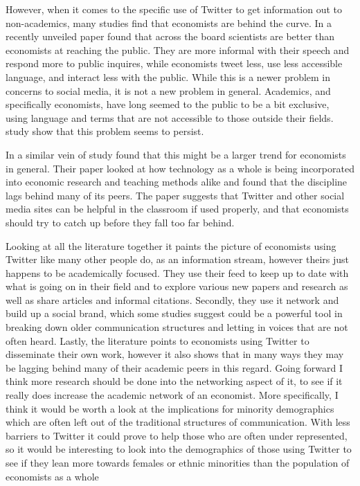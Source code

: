 \documentclass[12pt, Times New Roman]{article}
\begin{document}
However, when it comes to the specific use of Twitter to get information out to non-academics, many studies find that economists are behind the curve. In a recently unveiled paper \citet{Giusta} found that across the board scientists are better than economists at reaching the public. They are more informal with their speech and respond more to public inquires, while economists tweet less, use less accessible language, and interact less with the public. While this is a newer problem in concerns to social media, it is not a new problem in general. Academics, and specifically economists, have long seemed to the public to be a bit exclusive, using language and terms that are not accessible to those outside their fields. \citet{Giusta} study show that this problem seems to persist. 

In a similar vein of study \citet{Bahrani} found that this might be a larger trend for economists in general. Their paper looked at how technology as a whole is being incorporated into economic research and teaching methods alike and found that the discipline lags behind many of its peers. The paper suggests that Twitter and other social media sites can be helpful in the classroom if used properly, and that economists should try to catch up before they fall too far behind. 

Looking at all the literature together it paints the picture of economists using Twitter like many other people do, as an information stream, however theirs just happens to be academically focused. They use their feed to keep up to date with what is going on in their field and to explore various new papers and research as well as share articles and informal citations. Secondly, they use it network and build up a social brand, which some studies suggest could be a powerful tool in breaking down older communication structures and letting in voices that are not often heard. Lastly, the literature points to economists using Twitter to disseminate their own work, however it also shows that in many ways they may be lagging behind many of their academic peers in this regard. Going forward I think more research should be done into the networking aspect of it, to see if it really does increase the academic network of an economist. More specifically, I think it would be worth a look at the implications for minority demographics which are often left out of the traditional structures of communication. With less barriers to Twitter it could prove to help those who are often under represented, so it would be interesting to look into the demographics of those using Twitter to see if they lean more towards females or ethnic minorities than the population of economists as a whole
\end{document}
